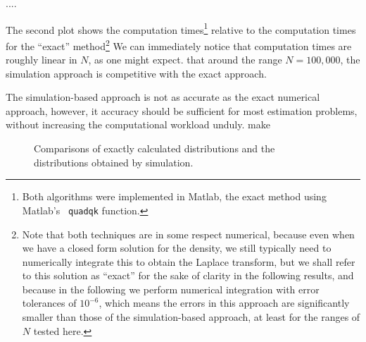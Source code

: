 ....





The second plot shows the computation times\footnote{Both algorithms
  were implemented in Matlab, the exact method using Matlab's {\tt
    quadqk} function. } relative to the computation times for the
``exact'' method\footnote{Note that both techniques are in some
  respect numerical, because even when we have a closed form solution
  for the density, we still typically need to numerically integrate
  this to obtain the Laplace transform, but we shall refer to this
  solution as ``exact'' for the sake of clarity in the following
  results, and because in the following we perform numerical
  integration with error tolerances of $10^{-6}$, which means the
  errors in this approach are significantly smaller than those of the
  simulation-based approach, at least for the ranges of $N$ tested
  here.}  We can immediately notice that computation times are roughly
linear in $N$, as one might expect. that around the range $N=100,000$,
the simulation approach is competitive with the exact approach.

The simulation-based approach is not as accurate as the exact
numerical approach, however, it accuracy should be sufficient for most
estimation problems, without increasing the computational workload
unduly.
make



\begin{figure}[tbp]
  \begin{center}



    \caption{\label{fig:sim_vs_exact}Comparisons of exactly calculated distributions and the
      distributions obtained by simulation.}
  \end{center} 
\vspace{-4mm}
\end{figure}

